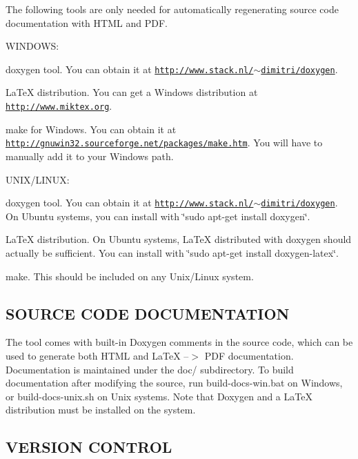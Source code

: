 The following tools are only needed for automatically regenerating source code documentation with H\-T\-M\-L and P\-D\-F.

W\-I\-N\-D\-O\-W\-S\-:


\begin{DoxyItemize}
\item doxygen tool. You can obtain it at \href{http://www.stack.nl/~dimitri/doxygen}{\tt http\-://www.\-stack.\-nl/$\sim$dimitri/doxygen}.
\item La\-Te\-X distribution. You can get a Windows distribution at \href{http://www.miktex.org}{\tt http\-://www.\-miktex.\-org}.
\item make for Windows. You can obtain it at \href{http://gnuwin32.sourceforge.net/packages/make.htm}{\tt http\-://gnuwin32.\-sourceforge.\-net/packages/make.\-htm}. You will have to manually add it to your Windows path.
\end{DoxyItemize}

U\-N\-I\-X/\-L\-I\-N\-U\-X\-:


\begin{DoxyItemize}
\item doxygen tool. You can obtain it at \href{http://www.stack.nl/~dimitri/doxygen}{\tt http\-://www.\-stack.\-nl/$\sim$dimitri/doxygen}. On Ubuntu systems, you can install with \char`\"{}sudo apt-\/get install doxygen\char`\"{}.
\item La\-Te\-X distribution. On Ubuntu systems, La\-Te\-X distributed with doxygen should actually be sufficient. You can install with \char`\"{}sudo apt-\/get install doxygen-\/latex\char`\"{}.
\item make. This should be included on any Unix/\-Linux system. 

 \subsection*{S\-O\-U\-R\-C\-E C\-O\-D\-E D\-O\-C\-U\-M\-E\-N\-T\-A\-T\-I\-O\-N }
\end{DoxyItemize}

The tool comes with built-\/in Doxygen comments in the source code, which can be used to generate both H\-T\-M\-L and La\-Te\-X --$>$ P\-D\-F documentation. Documentation is maintained under the doc/ subdirectory. To build documentation after modifying the source, run build-\/docs-\/win.\-bat on Windows, or build-\/docs-\/unix.\-sh on Unix systems. Note that Doxygen and a La\-Te\-X distribution must be installed on the system. 

 \subsection*{V\-E\-R\-S\-I\-O\-N C\-O\-N\-T\-R\-O\-L }

